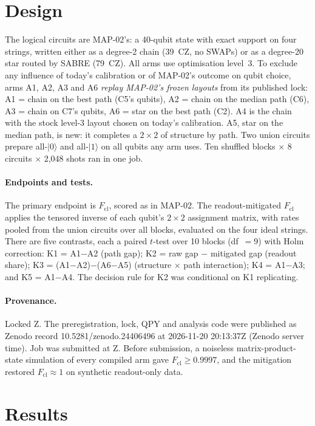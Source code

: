 \documentclass[10pt,twocolumn]{article}
\begin{document}
\section{Design}
The logical circuits are MAP-02's: a 40-qubit state with exact support on four strings, written
either as a degree-2 chain (39~CZ, no SWAPs) or as a degree-20 star routed by SABRE (79~CZ). All arms
use optimisation level~3. To exclude any influence of today's calibration or of MAP-02's outcome on
qubit choice, arms A1, A2, A3 and A6 \emph{replay MAP-02's frozen layouts} from its published lock:
A1 = chain on the best path (C5's qubits), A2 = chain on the median path (C6), A3 = chain on C7's
qubits, A6 = star on the best path (C2). A4 is the chain with the stock level-3 layout chosen on
today's calibration. A5, star on the median path, is new: it completes a $2\times2$ of structure by path.
Two union circuits prepare all-$|0\rangle$ and all-$|1\rangle$ on all \UnionN{} qubits any arm uses. Ten
shuffled blocks $\times$ 8 circuits $\times$ 2{,}048 shots ran in one job.

\paragraph{Endpoints and tests.} The primary endpoint is $F_{\mathrm{cl}}$, scored as in MAP-02. The
readout-mitigated $F_{\mathrm{cl}}$ applies the tensored inverse of each qubit's $2\times2$ assignment
matrix, with rates pooled from the union circuits over all blocks, evaluated on the four ideal strings.
There are five contrasts, each a paired $t$-test over 10 blocks (df~$=9$) with Holm correction:
K1 = A1$-$A2 (path gap);
K2 = raw gap $-$ mitigated gap (readout share);
K3 = (A1$-$A2)$-$(A6$-$A5) (structure $\times$ path interaction);
K4 = A1$-$A3; and K5 = A1$-$A4. The decision rule for K2 was conditional on K1 replicating.

\paragraph{Provenance.} Locked \LockedUtc{}Z. The preregistration, lock, QPY and analysis code were
published as Zenodo record 10.5281/zenodo.24406496 at 2026-11-20 20:13:37Z (Zenodo server
time). Job \texttt{\JobId} was submitted at \SubmittedUtc{}Z. Before submission, a noiseless
matrix-product-state simulation of every compiled arm gave $F_{\mathrm{cl}}\ge0.9997$, and the
mitigation restored $F_{\mathrm{cl}}\approx1$ on synthetic readout-only data.

\section{Results}
\end{document}
